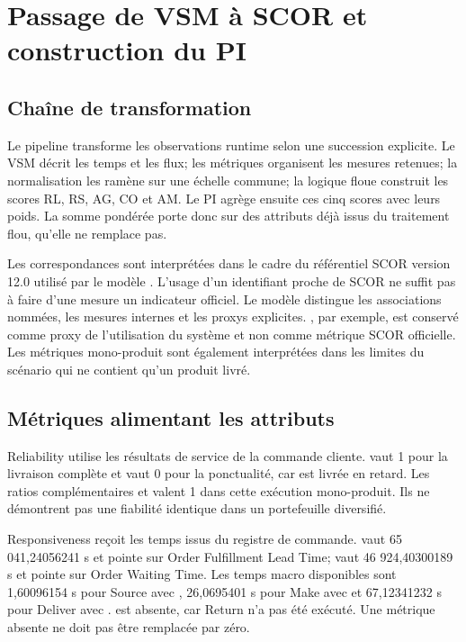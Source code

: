 \chapter{Passage de VSM à SCOR et construction du PI}
\label{chap:scor-pi}

\section{Chaîne de transformation}

Le pipeline transforme les observations runtime selon une succession explicite. Le VSM décrit les temps et les flux; les métriques organisent les mesures retenues; la normalisation les ramène sur une échelle commune; la logique floue construit les scores RL, RS, AG, CO et AM. Le PI agrège ensuite ces cinq scores avec leurs poids. La somme pondérée porte donc sur des attributs déjà issus du traitement flou, qu'elle ne remplace pas.


Les correspondances sont interprétées dans le cadre du référentiel SCOR version 12.0 utilisé par le modèle \cite{apics2017}. L'usage d'un identifiant proche de SCOR ne suffit pas à faire d'une mesure un indicateur officiel. Le modèle distingue les associations nommées, les mesures internes et les proxys explicites. , par exemple, est conservé comme proxy de l'utilisation du système et non comme métrique SCOR officielle. Les métriques mono-produit sont également interprétées dans les limites du scénario qui ne contient qu'un produit livré.

\section{Métriques alimentant les attributs}

Reliability utilise les résultats de service de la commande cliente.  vaut 1 pour la livraison complète et  vaut 0 pour la ponctualité, car  est livrée en retard. Les ratios complémentaires  et  valent 1 dans cette exécution mono-produit. Ils ne démontrent pas une fiabilité identique dans un portefeuille diversifié.

Responsiveness reçoit les temps issus du registre de commande.  vaut 65 041,24056241 s et pointe sur Order Fulfillment Lead Time;  vaut 46 924,40300189 s et pointe sur Order Waiting Time. Les temps macro disponibles sont 1,60096154 s pour Source avec , 26,0695401 s pour Make avec  et 67,12341232 s pour Deliver avec .  est absente, car Return n'a pas été exécuté. Une métrique absente ne doit pas être remplacée par zéro.

